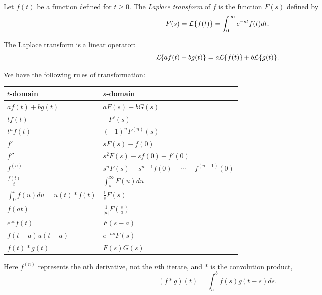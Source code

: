 \begin{definition}
Let $f(t)$ be a function defined for $t\geq 0$. The \emph{Laplace transform} of $f$ is the function $F(s)$ defined by
\[
F(s)=\mathcal{L}\{f(t)\}=\int_0^\infty e^{-st}f(t)dt.
\]
\end{definition}
The Laplace transform is a linear operator:
\[
\mathcal{L}\{af(t)+bg(t)\}=a\mathcal{L}\{f(t)\}+b\mathcal{L}\{g(t)\}.
\]


We have the following rules of transformation:
\begin{center}
\begin{tabular}{ll}
$t$-domain & $s$-domain\\
\hline
$af(t)+bg(t)$ & $aF(s)+bG(s)$ \\
$tf(t)$ & $-F'(s)$ \\
$t^nf(t)$ & $(-1)^nF^{(n)}(s)$ \\
$f'$ & $sF(s)-f(0)$ \\
$f''$ & $s^2F(s)-sf(0)-f'(0)$ \\
$f^{(n)}$ & $s^nF(s)-s^{n-1}f(0)-\cdots-f^{(n-1)}(0)$ \\
$\frac{f(t)}{t}$ & $\int_s^\infty F(u)du$ \\
$\int_0^t f(u)du=u(t)\ast f(t)$ & $\frac 1s F(s)$ \\
$f(at)$ & $\frac 1{|a|}F\left(\frac sa\right)$ \\
$e^{at}f(t)$ & $F(s-a)$ \\
$f(t-a)u(t-a)$ & $e^{-as}F(s)$ \\
$f(t)\ast g(t)$ & $F(s)G(s)$
\end{tabular}
\end{center}
Here $f^{(n)}$ represents the $n$th derivative, not the $n$th iterate, and $\ast$ is the convolution product,
\[
(f\ast g)(t)=\int_a^b f(s)g(t-s)ds.
\]



